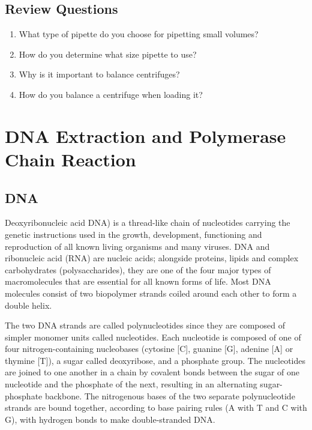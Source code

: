 \documentclass[]{book}
\providecommand{\tightlist}{%
  \setlength{\itemsep}{0pt}\setlength{\parskip}{0pt}}
\theoremstyle{definition}
\theoremstyle{definition}
\theoremstyle{definition}
\theoremstyle{remark}
\begin{document}
\section{Review Questions}\label{review-questions-4}

\begin{enumerate}
\def\labelenumi{\arabic{enumi}.}
\tightlist
\item
  What type of pipette do you choose for pipetting small volumes?
\item
  How do you determine what size pipette to use?
\item
  Why is it important to balance centrifuges?
\item
  How do you balance a centrifuge when loading it?
\end{enumerate}

\chapter{DNA Extraction and Polymerase Chain
Reaction}\label{dna-extraction-and-polymerase-chain-reaction}

\section{DNA}\label{dna}

Deoxyribonucleic acid DNA) is a thread-like chain of nucleotides
carrying the genetic instructions used in the growth, development,
functioning and reproduction of all known living organisms and many
viruses. DNA and ribonucleic acid (RNA) are nucleic acids; alongside
proteins, lipids and complex carbohydrates (polysaccharides), they are
one of the four major types of macromolecules that are essential for all
known forms of life. Most DNA molecules consist of two biopolymer
strands coiled around each other to form a double helix.

The two DNA strands are called polynucleotides since they are composed
of simpler monomer units called nucleotides. Each nucleotide is composed
of one of four nitrogen-containing nucleobases (cytosine {[}C{]},
guanine {[}G{]}, adenine {[}A{]} or thymine {[}T{]}), a sugar called
deoxyribose, and a phosphate group. The nucleotides are joined to one
another in a chain by covalent bonds between the sugar of one nucleotide
and the phosphate of the next, resulting in an alternating
sugar-phosphate backbone. The nitrogenous bases of the two separate
polynucleotide strands are bound together, according to base pairing
rules (A with T and C with G), with hydrogen bonds to make
double-stranded DNA.
\end{document}
